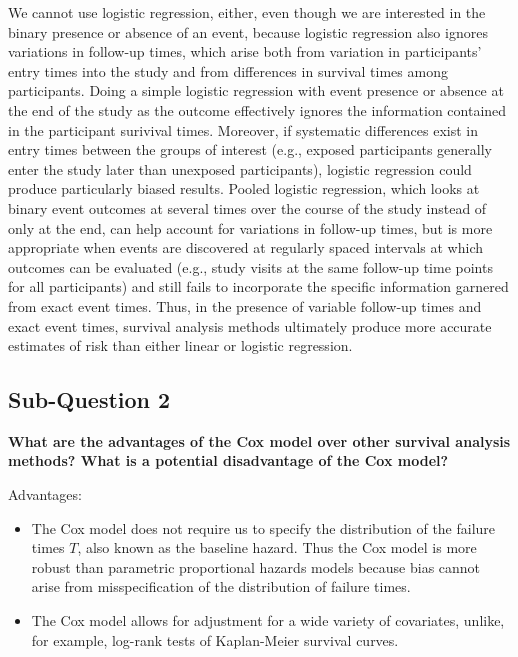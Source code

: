 \documentclass{article}\usepackage[]{graphicx}\usepackage[]{color}
\begin{document}
\vspace{2mm}

We cannot use logistic regression, either, even though we are interested in the binary presence or absence of an event, because logistic regression also ignores variations in follow-up times, which arise both from variation in participants' entry times into the study and from differences in survival times among participants.  Doing a simple logistic regression with event presence or absence at the end of the study as the outcome effectively ignores the information contained in the participant surivival times.  Moreover, if systematic differences exist in entry times between the groups of interest (e.g., exposed participants generally enter the study later than unexposed participants), logistic regression could produce particularly biased results.  Pooled logistic regression, which looks at binary event outcomes at several times over the course of the study instead of only at the end, can help account for variations in follow-up times, but is more appropriate when events are discovered at regularly spaced intervals at which outcomes can be evaluated (e.g., study visits at the same follow-up time points for all participants) and still fails to incorporate the specific information garnered from exact event times.  Thus, in the presence of variable follow-up times and exact event times, survival analysis methods ultimately produce more accurate estimates of risk than either linear or logistic regression.

\subsection*{Sub-Question 2}
\textbf{What are the advantages of the Cox model over other survival analysis methods? What is a potential disadvantage of the Cox model?}

\vspace{2mm}

Advantages:

\begin{itemize}

\item The Cox model does not require us to specify the distribution of the failure times $T$, also known as the baseline hazard.  Thus the Cox model is more robust than parametric proportional hazards models because bias cannot arise from misspecification of the distribution of failure times.

\item The Cox model allows for adjustment for a wide variety of covariates, unlike, for example, log-rank tests of Kaplan-Meier survival curves.

\end{itemize}
\end{document}
